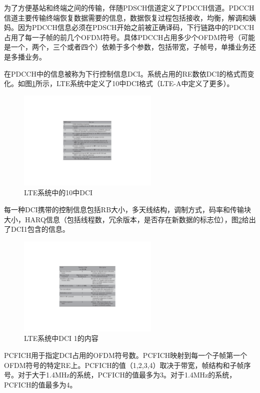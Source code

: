 \documentclass[10pt,a4paper,UTF8]{article}
\begin{document}
为了方便基站和终端之间的传输，伴随PDSCH信道定义了PDCCH信道。PDCCH信道主要传输终端恢复数据需要的信息，数据恢复过程包括接收，均衡，解调和姨妈。因为PDCCH信息必须在PDSCH开始之前被正确译码，下行链路中的PDCCH占用了每一子帧的前几个OFDM符号。具体PDCCH占用多少个OFDM符号（可能是一个，两个，三个或者四个）依赖于多个参数，包括带宽，子帧号，单播业务还是多播业务。

在PDCCH中的信息被称为下行控制信息DCI。系统占用的RE数依DCI的格式而变化。如图\ref{fig:orgparagraph7}所示，LTE系统中定义了10中DCI格式（LTE-A中定义了更多）。

\begin{figure}[htb]
\centering
\includegraphics[width=0.6\textwidth]{../../img/20151101ltetenDCI.pdf}
\caption{\label{fig:orgparagraph7}
LTE系统中的10中DCI}
\end{figure}

每一种DCI携带的控制信息包括RB大小，多天线结构，调制方式，码率和传输块大小，HARQ信息（包括线程数，冗余版本，是否存在新数据的标志位），图\ref{fig:orgparagraph8}给出了DCI1包含的信息。

\begin{figure}[htb]
\centering
\includegraphics[width=0.6\textwidth]{../../img/20151101lteDCI1.pdf}
\caption{\label{fig:orgparagraph8}
LTE系统中DCI 1的内容}
\end{figure}

PCFICH用于指定DCI占用的OFDM符号数。PCFICH映射到每一个子帧第一个OFDM符号的特定RE上。PCFICH的值（1,2,3,4）取决于带宽，帧结构和子帧序号。对于大于1.4MHz的系统，PCFICH的值最多为3。对于1.4MHz的系统，PCFICH的值最多为4。
\end{document}
